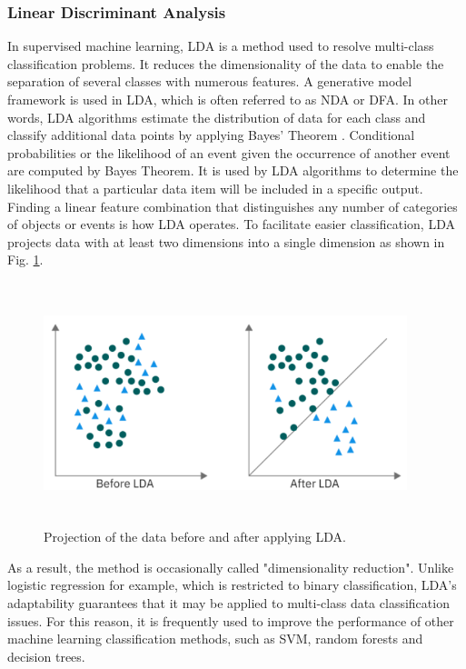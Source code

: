 \subsubsection{Linear Discriminant Analysis}
In supervised machine learning, \ac{LDA} is a method used to resolve multi-class classification problems. It reduces the dimensionality of the data to enable the separation of several classes with numerous features. A generative model framework is used in \ac{LDA}, which is often referred to as \ac{NDA} or \ac{DFA}. In other words, \ac{LDA} algorithms estimate the distribution of data for each class and classify additional data points by applying Bayes' Theorem \cite{bellman46adaptive}. Conditional probabilities or the likelihood of an event given the occurrence of another event are computed by Bayes Theorem. It is used by \ac{LDA} algorithms to determine the likelihood that a particular data item will be included in a specific output. Finding a linear feature combination that distinguishes any number of categories of objects or events is how \ac{LDA} operates. To facilitate easier classification, \ac{LDA} projects data with at least two dimensions into a single dimension as shown in Fig. \ref{fig:lda}. 
\begin{figure}[h]
  \centering
  \includegraphics[width=300pt,height=200pt]{pictures/lda.PNG}
  \caption{Projection of the data before and after applying \ac{LDA}.\cite{dr}}
  \label{fig:lda}
\end{figure} 
As a result, the method is occasionally called "dimensionality reduction". Unlike logistic regression for example, which is restricted to binary classification, \ac{LDA}'s adaptability guarantees that it may be applied to multi-class data classification issues. For this reason, it is frequently used to improve the performance of other machine learning classification methods, such as \ac{SVM}, random forests and decision trees.\cite{xanthopoulos2013linear}

